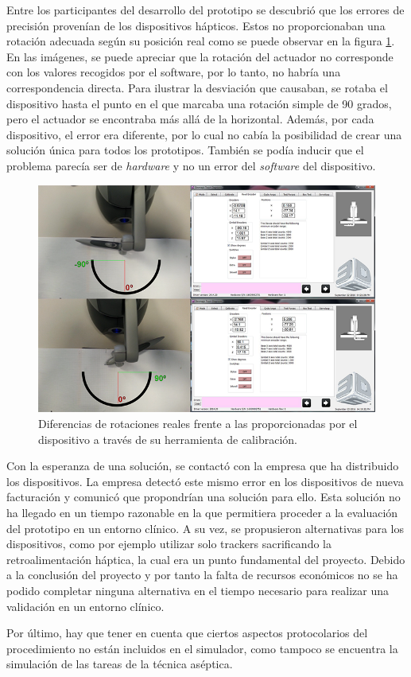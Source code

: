 Entre los participantes del desarrollo del prototipo se descubrió que los errores de precisión provenían de los dispositivos hápticos. Estos no proporcionaban una rotación adecuada según su posición real como se puede observar en la figura \ref{fig:errorhaptic}. En las imágenes, se puede apreciar que la rotación del actuador no corresponde con los valores recogidos por el software, por lo tanto, no habría una correspondencia directa. Para ilustrar la desviación que causaban, se rotaba el dispositivo hasta el punto en el que marcaba una rotación simple de 90 grados, pero el actuador se encontraba más allá de la horizontal. Además, por cada dispositivo, el error era diferente, por lo cual no cabía la posibilidad de crear una solución única para todos los prototipos. También se podía inducir que el problema parecía ser de \emph{hardware} y no un error del \emph{software} del dispositivo.


\begin{figure}[h]
\centering
\includegraphics[width=0.5\linewidth]{IMG/errorhaptic.png}
\caption{\label{fig:errorhaptic}Diferencias de rotaciones reales frente a las proporcionadas por el dispositivo a través de su herramienta de calibración.}
\end{figure}

Con la esperanza de una solución, se contactó con la empresa que ha distribuido los dispositivos. La empresa detectó este mismo error en los dispositivos de nueva facturación y comunicó que propondrían una solución para ello. Esta solución no ha llegado en un tiempo razonable en la que permitiera proceder a la evaluación del prototipo en un entorno clínico. A su vez, se propusieron alternativas para los dispositivos, como por ejemplo utilizar solo \ac{tracker}s sacrificando la retroalimentación háptica, la cual era un punto fundamental del proyecto. Debido a la conclusión del proyecto y por tanto la falta de recursos económicos no se ha podido completar ninguna alternativa en el tiempo necesario para realizar una validación en un entorno clínico.



Por último, hay que tener en cuenta que ciertos aspectos protocolarios del procedimiento no están incluidos en el simulador, como tampoco se encuentra la simulación de las tareas de la técnica aséptica.




